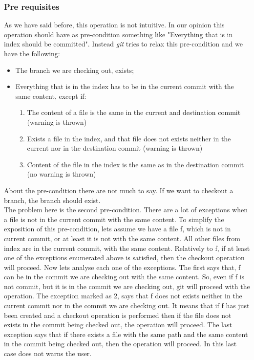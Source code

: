 \subsubsection{Pre requisites}
As we have said before, this operation is not intuitive. In our
opinion this operation should have as pre-condition something like
"Everything that is in index should be committed". Instead \emph{git}
tries to relax this pre-condition and we have the following:
\begin{itemize}
   \item The branch we are checking out, exists;
   \item Everything that is in the index has to be in the current commit with the
      same content, except if:
      \begin{enumerate}
         \item The content of a file is the same in the
         current and destination commit (warning is thrown)
         \item Exists a file in the index, and that file does not exists
         neither in the current nor in the destination commit (warning is thrown)
         \item Content of the file in the index is the same as in the
         destination commit (no warning is thrown)
      \end{enumerate}
\end{itemize}

About the pre-condition there are not much to say. If we want to
checkout a branch, the branch should exist.\\

The problem here is the second pre-condition. There are a lot of
exceptions when a file is not in the current commit with the same
content. To simplify the exposition of this pre-condition, lets assume
we have a file f, which is not in current commit, or at least it is not
with the same content. All other files from index are in the current commit, with
the same content. Relatively to f, if at least one of the exceptions enumerated above
is satisfied, then the checkout operation will proceed. Now lets
analyse each one of the exceptions. The first says that, f can 
be in the commit we are checking out with the same content. So, even
if f is not commit, but it is in the commit we are checking out, git
will proceed with the operation. The exception marked as 2, says that
f does not exists neither in the current commit nor in the commit we
are checking out. It means that if f has just been created and a
checkout operation is performed then if the file does not exists in
the commit being checked out, the operation will proceed. The last
exception says that if there exists a file with the same path and the
same content in the commit being checked out, then the operation will
proceed. In this last case does not warns the user.

